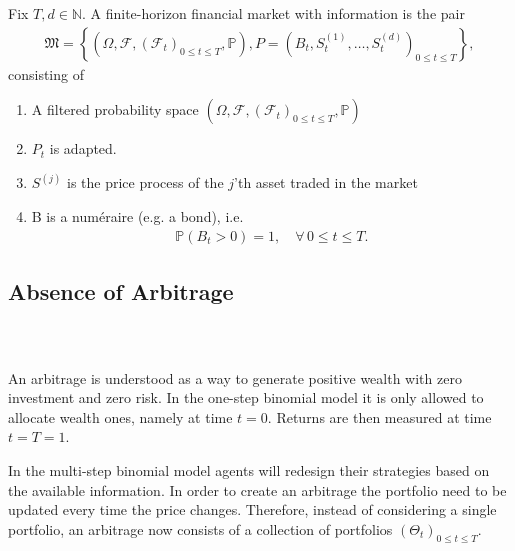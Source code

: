 \documentclass{beamer}
\numberwithin{equation}{section}
\begin{document}
\begin{frame}\frametitle{{\normalsize \secname} \\ {\large \subsecname}}
    \begin{definition}
        Fix $T, d \in \mathbb{N}$.
        A finite-horizon financial market with information is the pair
        \begin{align}
            \mathfrak{M} =
            \left\{
                \left(
                    \Omega,
                    \mathscr{F},
                    \left(
                        \mathscr{F}_t
                    \right)_{0 \leq t \leq T},
                    \mathbb{P}
                \right),
                P =
                \left(
                    B_t,
                    S_t^{(1)},
                    \ldots,
                    S_t^{(d)}
                \right)_{0 \leq t \leq T}
            \right\},
        \end{align}
        consisting of
        \begin{enumerate}
            \item A filtered probability space
            $\left(
                \Omega,
                \mathscr{F},
                \left(
                    \mathscr{F}_t
                \right)_{0 \leq t \leq T},
                \mathbb{P}
            \right)$
            \item $P_t$ is adapted.
            \item $S^{(j)}$ is the price process of the $j$'th asset traded in the market
            \item B is a numéraire (e.g. a bond), i.e.
            \begin{align}
                \mathbb{P}(B_t > 0) = 1, \quad \forall \, 0 \leq t \leq T.
            \end{align}
        \end{enumerate}
    \end{definition}
\end{frame}

\subsection{Absence of Arbitrage}

\begin{frame}\frametitle{{\normalsize \secname} \\ {\large \subsecname}}
    An arbitrage is understood as a way to generate positive wealth with zero investment and zero risk.
    In the one-step binomial model it is only allowed to allocate wealth ones, namely at time $t = 0$.
    Returns are then measured at time $t = T = 1$.

    In the multi-step binomial model agents will redesign their strategies based on the available information.
    In order to create an arbitrage the portfolio need to be updated every time the price changes.
    Therefore, instead of considering a single portfolio, an arbitrage now consists of a collection of portfolios $\left(\Theta_t\right)_{0 \leq t \leq T}$.
\end{frame}
\end{document}
